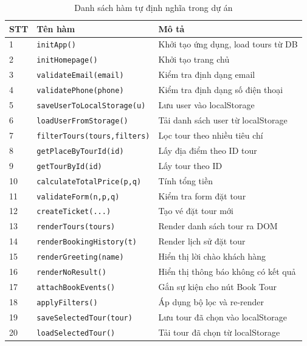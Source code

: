 \documentclass[12pt,a4paper]{article}
\begin{document}
\begin{table}[H]
\centering
\caption{Danh sách hàm tự định nghĩa trong dự án}
\begin{tabularx}{\textwidth}{|l|l|X|}
\hline
\textbf{STT} & \textbf{Tên hàm} & \textbf{Mô tả} \\
\hline
1  & \texttt{initApp()}               & Khởi tạo ứng dụng, load tours từ DB \\
\hline
2  & \texttt{initHomepage()}           & Khởi tạo trang chủ \\
\hline
3  & \texttt{validateEmail(email)}     & Kiểm tra định dạng email \\
\hline
4  & \texttt{validatePhone(phone)}     & Kiểm tra định dạng số điện thoại \\
\hline
5  & \texttt{saveUserToLocalStorage(u)}& Lưu user vào localStorage \\
\hline
6  & \texttt{loadUserFromStorage()}    & Tải danh sách user từ localStorage \\
\hline
7  & \texttt{filterTours(tours,filters)}& Lọc tour theo nhiều tiêu chí \\
\hline
8  & \texttt{getPlaceByTourId(id)}     & Lấy địa điểm theo ID tour \\
\hline
9  & \texttt{getTourById(id)}          & Lấy tour theo ID \\
\hline
10 & \texttt{calculateTotalPrice(p,q)} & Tính tổng tiền \\
\hline
11 & \texttt{validateForm(n,p,q)}      & Kiểm tra form đặt tour \\
\hline
12 & \texttt{createTicket(...)}        & Tạo vé đặt tour mới \\
\hline
13 & \texttt{renderTours(tours)}       & Render danh sách tour ra DOM \\
\hline
14 & \texttt{renderBookingHistory(t)}  & Render lịch sử đặt tour \\
\hline
15 & \texttt{renderGreeting(name)}     & Hiển thị lời chào khách hàng \\
\hline
16 & \texttt{renderNoResult()}         & Hiển thị thông báo không có kết quả \\
\hline
17 & \texttt{attachBookEvents()}       & Gắn sự kiện cho nút Book Tour \\
\hline
18 & \texttt{applyFilters()}           & Áp dụng bộ lọc và re-render \\
\hline
19 & \texttt{saveSelectedTour(tour)}   & Lưu tour đã chọn vào localStorage \\
\hline
20 & \texttt{loadSelectedTour()}       & Tải tour đã chọn từ localStorage \\

\end{tabularx}
\end{table}
\end{document}
